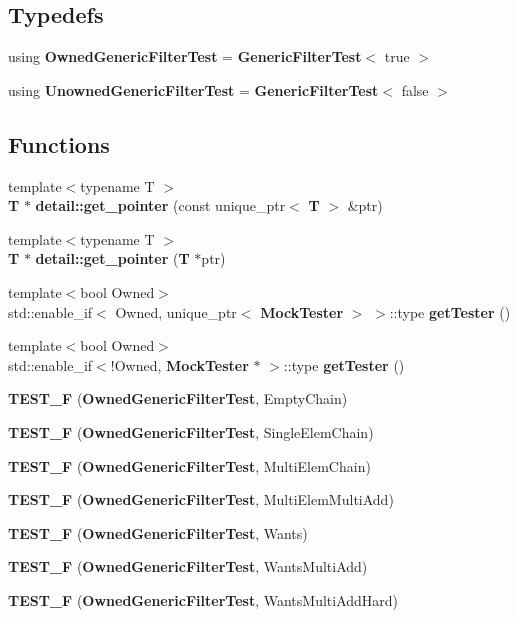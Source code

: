 \subsection*{Typedefs}
\begin{DoxyCompactItemize}
\item 
using {\bf Owned\+Generic\+Filter\+Test} = {\bf Generic\+Filter\+Test}$<$ true $>$
\item 
using {\bf Unowned\+Generic\+Filter\+Test} = {\bf Generic\+Filter\+Test}$<$ false $>$
\end{DoxyCompactItemize}
\subsection*{Functions}
\begin{DoxyCompactItemize}
\item 
{\footnotesize template$<$typename T $>$ }\\{\bf T} $\ast$ {\bf detail\+::get\+\_\+pointer} (const unique\+\_\+ptr$<$ {\bf T} $>$ \&ptr)
\item 
{\footnotesize template$<$typename T $>$ }\\{\bf T} $\ast$ {\bf detail\+::get\+\_\+pointer} ({\bf T} $\ast$ptr)
\item 
{\footnotesize template$<$bool Owned$>$ }\\std\+::enable\+\_\+if$<$ Owned, unique\+\_\+ptr$<$ {\bf Mock\+Tester} $>$ $>$\+::type {\bf get\+Tester} ()
\item 
{\footnotesize template$<$bool Owned$>$ }\\std\+::enable\+\_\+if$<$!Owned, {\bf Mock\+Tester} $\ast$ $>$\+::type {\bf get\+Tester} ()
\item 
{\bf T\+E\+S\+T\+\_\+F} ({\bf Owned\+Generic\+Filter\+Test}, Empty\+Chain)
\item 
{\bf T\+E\+S\+T\+\_\+F} ({\bf Owned\+Generic\+Filter\+Test}, Single\+Elem\+Chain)
\item 
{\bf T\+E\+S\+T\+\_\+F} ({\bf Owned\+Generic\+Filter\+Test}, Multi\+Elem\+Chain)
\item 
{\bf T\+E\+S\+T\+\_\+F} ({\bf Owned\+Generic\+Filter\+Test}, Multi\+Elem\+Multi\+Add)
\item 
{\bf T\+E\+S\+T\+\_\+F} ({\bf Owned\+Generic\+Filter\+Test}, Wants)
\item 
{\bf T\+E\+S\+T\+\_\+F} ({\bf Owned\+Generic\+Filter\+Test}, Wants\+Multi\+Add)
\item 
{\bf T\+E\+S\+T\+\_\+F} ({\bf Owned\+Generic\+Filter\+Test}, Wants\+Multi\+Add\+Hard)
\item 

\end{DoxyCompactItemize}
